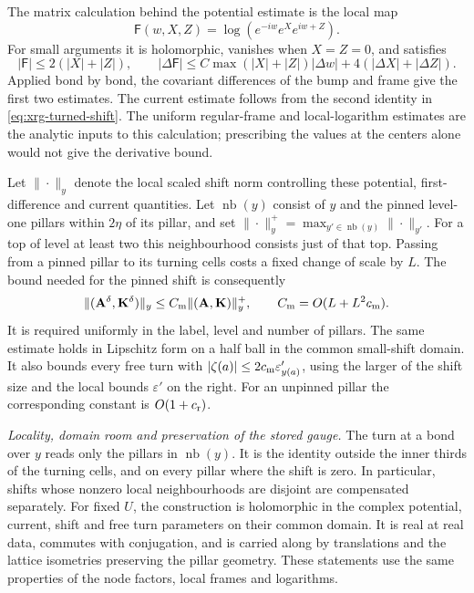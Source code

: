 \documentclass[11pt,letterpaper,reqno]{amsart}
\theoremstyle{definition}
\theoremstyle{remark}
\begin{document}
The matrix calculation behind the potential estimate is the
local map
\[
 \mathsf F(w,X,Z)=\log(e^{-iw}e^Xe^{iw+Z}).
\]
For small arguments it is holomorphic, vanishes when \(X=Z=0\),
and satisfies
\[
 |\mathsf F|\le2(|X|+|Z|),\qquad
 |\Delta\mathsf F|
 \le C\max(|X|+|Z|)|\Delta w|
                         +4(|\Delta X|+|\Delta Z|).
\]
Applied bond by bond, the covariant differences of the bump and
frame give the first two estimates. The current estimate follows
from the second identity in \eqref{eq:xrg-turned-shift}. The
uniform regular-frame and local-logarithm estimates are the
analytic inputs to this calculation; prescribing the values at
the centers alone would not give the derivative bound.

Let \(\|\cdot\|_y\) denote the local scaled shift norm controlling
these potential, first-difference and current quantities. Let
\(\operatorname{nb}(y)\) consist of \(y\) and the pinned
level-one pillars within \(2\eta\) of its pillar, and set
\(\|\cdot\|_y^+=\max_{y'\in\operatorname{nb}(y)}
\|\cdot\|_{y'}\). For a top of level at least two this
neighbourhood consists just of that top. Passing from a pinned
pillar to its turning cells costs a fixed change of scale by
\(L\). The bound needed for the pinned shift is consequently
\begin{equation}\label{eq:xrg-pinned-shift-bound}
 \|(\mathbf A^\delta,\mathbf K^\delta)\|_y
   \le C_{\rm m}\|(\mathbf A,\mathbf K)\|_y^+,
                 \qquad C_{\rm m}=O(L+L^2c_{\rm m}).
\end{equation}
It is required uniformly in the label, level and number of
pillars. The same estimate holds in Lipschitz form on a half
ball in the common small-shift domain. It also bounds every free
turn with \( |\zeta(a)|\le2c_{\rm m}\varepsilon'_{y(a)}\),
using the larger of the shift size and the local bounds
\(\varepsilon'\) on the right. For an unpinned pillar the
corresponding constant is \(O(1+c_{\rm r})\).

\emph{Locality, domain room and preservation of the stored gauge.}
The turn at a bond over \(y\) reads only the pillars in
\(\operatorname{nb}(y)\). It is the identity outside the inner
thirds of the turning cells, and on every pillar where the shift
is zero. In particular, shifts whose nonzero local
neighbourhoods are disjoint are compensated separately. For
fixed \(U\), the construction is holomorphic in the complex
potential, current, shift and free turn parameters on their
common domain. It is real at real data, commutes with conjugation,
and is carried along by translations and the lattice isometries
preserving the pillar geometry. These statements use the same
properties of the node factors, local frames and logarithms.
\end{document}
